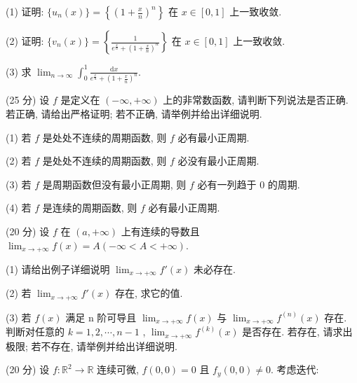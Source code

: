(1) 证明: $\{u_n(x)\} = \left\{\left(1 + \frac{x}{n}\right)^n\right\}$ 在 $x \in [0,1]$ 上一致收敛.\par
(2) 证明: $\{v_n(x)\} = \left\{\frac{1}{e^{\frac{x}{n}} + (1 + \frac{x}{n})^n}\right\}$ 在 $x \in [0,1]$ 上一致收敛.\par
(3) 求 $\lim_{n\to \infty}\int_0^1\frac{\mathrm{d}x}{e^{\frac{x}{n}} + (1 + \frac{x}{n})^n}$.\par
(25 分) 设 $f$ 是定义在 $(- \infty, + \infty)$ 上的非常数函数, 请判断下列说法是否正确. 若正确, 请给出严格证明; 若不正确, 请举例并给出详细说明.\par
(1) 若 $f$ 是处处不连续的周期函数, 则 $f$ 必有最小正周期.\par
(2) 若 $f$ 是处处不连续的周期函数, 则 $f$ 必没有最小正周期.\par
(3) 若 $f$ 是周期函数但没有最小正周期, 则 $f$ 必有一列趋于 0 的周期.\par
(4) 若 $f$ 是连续的周期函数, 则 $f$ 必有最小正周期.\par
(20 分) 设 $f$ 在 $(a, +\infty)$ 上有连续的导数且 $\lim_{x \to +\infty} f(x) = A (-\infty < A < +\infty)$.\par
(1) 请给出例子详细说明 $\lim_{x \to +\infty} f'(x)$ 未必存在.\par
(2) 若 $\lim_{x\to +\infty}f'(x)$ 存在, 求它的值.\par
(3) 若  $f(x)$  满足 n 阶可导且  $\lim_{x\to+\infty}f(x)$  与  $\lim_{x\to+\infty}f^{(n)}(x)$  存在. 判断对任意的  $k=1,2,\cdots,n-1$ ,  $\lim_{x\to+\infty}f^{(k)}(x)$  是否存在. 若存在, 请求出极限; 若不存在, 请举例并给出详细说明.\par
\par{}
(20 分) 设 $f: \mathbb{R}^2 \to \mathbb{R}$ 连续可微, $f(0,0) = 0$ 且 $f_y(0,0) \neq 0$. 考虑迭代:\par
\nopagebreak[4]

